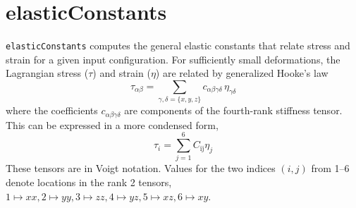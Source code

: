 \documentclass[letterpaper]{report}
\begin{document}
\section{elasticConstants}

{\tt elasticConstants} computes the general elastic constants that
relate stress and strain for a given input configuration.  For
sufficiently small deformations, the Lagrangian stress ($\tau$) and
strain ($\eta$) are related by generalized Hooke's law
\begin{equation}
    \tau_{\alpha\beta} = \sum_{\gamma,\delta=\{x,y,z\}} c_{\alpha\beta\gamma\delta} \,\eta_{\gamma\delta}
\end{equation}
where the coefficients $c_{\alpha\beta\gamma\delta}$ are components of the fourth-rank stiffness tensor. This can be expressed in a more condensed form,
\begin{equation}
    \tau_i=\sum_{j=1}^6 C_\mathrm{ij} \eta_j
\end{equation}
These tensors are in Voigt notation. Values for the two indices $(i, j)$ from 1--6 denote locations in the rank 2 tensors, $1\mapsto xx, 2\mapsto  yy, 3\mapsto zz, 4 \mapsto yz, 5 \mapsto xz, 6 \mapsto xy$.
\end{document}
